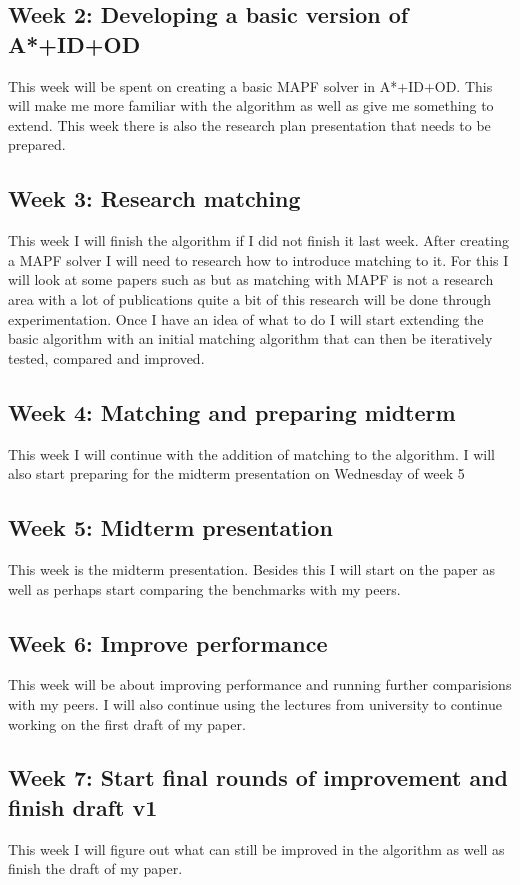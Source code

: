 \documentclass[english]{article}
\begin{document}
\subsection*{Week 2: Developing a basic version of A*+ID+OD}
This week will be spent on creating a basic MAPF solver in A*+ID+OD. This will make me more familiar with the algorithm as well as give me something to extend. This week there is also the research plan presentation that needs to be prepared.

\subsection*{Week 3: Research matching}
This week I will finish the algorithm if I did not finish it last week. 
After creating a MAPF solver I will need to research how to introduce matching to it. 
For this I will look at some papers such as \cite{ma2016TAPF} but as matching with MAPF is not a research area with a lot of publications quite a bit of this research will be done through experimentation.
Once I have an idea of what to do I will start extending the basic algorithm with an initial matching algorithm that can then be iteratively tested, compared and improved.

\subsection*{Week 4: Matching and preparing midterm}
This week I will continue with the addition of matching to the algorithm. I will also start preparing for the midterm presentation on Wednesday of week 5

\subsection*{Week 5: Midterm presentation}
This week is the midterm presentation. Besides this I will start on the paper as well as perhaps start comparing the benchmarks with my peers.

\subsection*{Week 6: Improve performance}
This week will be about improving performance and running further comparisions with my peers. I will also continue using the lectures from university to continue working on the first draft of my paper.

\subsection*{Week 7: Start final rounds of improvement and finish draft v1}
This week I will figure out what can still be improved in the algorithm as well as finish the draft of my paper.
\end{document}
